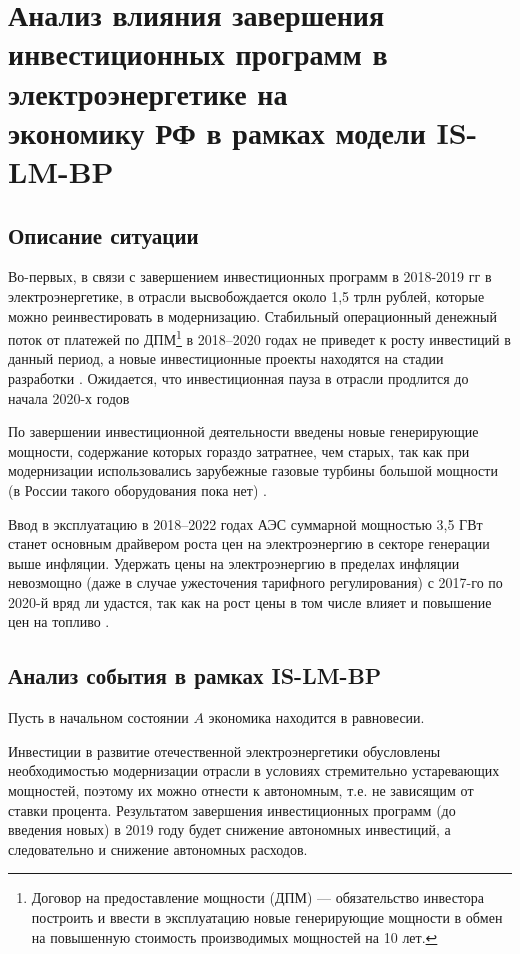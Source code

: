 \documentclass[12pt,a4paper, oneside]{extreport}
\begin{document}



\section*{Анализ влияния завершения инвестиционных программ в электроэнергетике на \\ экономику РФ в рамках модели IS-LM-BP}

\subsection*{Описание ситуации}
Во-первых, в связи с завершением инвестиционных программ в 2018-2019 гг в электроэнергетике, в отрасли высвобождается около 1,5 трлн рублей, которые можно реинвестировать в модернизацию. Стабильный операционный денежный поток от платежей по ДПМ\footnote{ Договор на предоставление мощности (ДПМ) — обязательство инвестора построить и ввести в эксплуатацию  новые генерирующие мощности в обмен на повышенную стоимость производимых мощностей на 10 лет. } в 2018–2020 годах не приведет к росту инвестиций в данный период, а новые инвестиционные проекты находятся на стадии разработки \cite{ID5, ID3}. Ожидается, что инвестиционная пауза в отрасли продлится до начала 2020-х годов \cite{ID7}

По завершении инвестиционной деятельности введены новые генерирующие мощности,  содержание которых гораздо затратнее, чем старых, так как при модернизации использовались зарубежные газовые турбины большой мощности (в России такого оборудования пока нет) \cite{ID1}.

Ввод в эксплуатацию в 2018–2022 годах АЭС суммарной мощностью 3,5 ГВт станет основным драйвером роста цен на электроэнергию в секторе генерации выше инфляции.
Удержать цены на электроэнергию в пределах инфляции невозмощно  (даже в случае ужесточения тарифного регулирования) с 2017-го по 2020-й вряд ли удастся, так как на рост цены в том числе влияет и повышение цен на топливо \cite{ID7}.

\subsection*{Анализ события в рамках IS-LM-BP}
Пусть в начальном состоянии $A$ экономика находится в равновесии.

Инвестиции в развитие отечественной электроэнергетики обусловлены необходимостью модернизации отрасли в условиях стремительно устаревающих мощностей, поэтому их можно отнести к автономным, т.е. не зависящим от ставки процента. Результатом завершения инвестиционных программ (до введения новых) в 2019 году будет снижение автономных инвестиций, а следовательно и  снижение автономных расходов.
\end{document}
